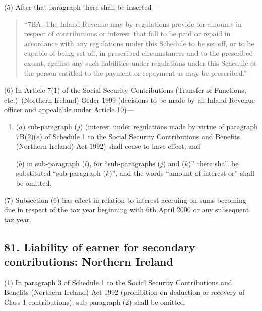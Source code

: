 \documentclass[12pt,a4paper]{article}
\begin{document}
(5) After that paragraph there shall be inserted—
\begin{quotation}
“7BA. The Inland Revenue may by regulations provide for amounts in respect of contributions or interest that fall to be paid or repaid in accordance with any regulations under this Schedule to be set off, or to be capable of being set off, in prescribed circumstances and to the prescribed extent, against any such liabilities under regulations under this Schedule of the person entitled to the payment or repayment as may be prescribed.”
\end{quotation}

(6) In Article 7(1)  of the Social Security Contributions (Transfer of Functions, etc.)\ (Northern Ireland) Order 1999 (decisions to be made by an Inland Revenue officer and appealable under Article 10)—
\begin{enumerate}\item[]
($a$) sub-paragraph ($j$)  (interest under regulations made by virtue of paragraph 7B(2)($e$)  of Schedule 1 to the Social Security Contributions and Benefits (Northern Ireland) Act 1992) shall cease to have effect; and

($b$) in sub-paragraph ($l$), for “sub-paragraphs ($j$)  and ($k$)” there shall be substituted “sub-paragraph ($k$)”, and the words “amount of interest or” shall be omitted.
\end{enumerate}

(7) Subsection (6)  has effect in relation to interest accruing on sums becoming due in respect of the tax year beginning with 6th April 2000 or any subsequent tax year.

\subsection{81. Liability of earner for secondary contributions: Northern Ireland}

(1) In paragraph 3 of Schedule 1 to the Social Security Contributions and Benefits (Northern Ireland) Act 1992 (prohibition on deduction or recovery of Class 1 contributions), sub-paragraph (2)  shall be omitted.
\end{document}
